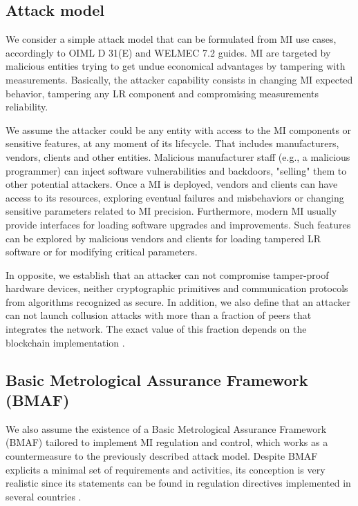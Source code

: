 \documentclass[conference]{IEEEtran}
\begin{document}
\subsection{Attack model}
We consider a simple attack model that can be formulated from MI use cases, accordingly to OIML D 31(E) and WELMEC 7.2 guides. MI are targeted by malicious entities trying to get undue economical advantages by tampering with measurements. Basically, the attacker capability consists in changing MI expected behavior, tampering any LR component and compromising measurements reliability. 

We assume the attacker could be any entity with access to the MI components or sensitive features, at any moment of its lifecycle. That includes manufacturers, vendors, clients and other entities. Malicious manufacturer staff (e.g., a malicious programmer) can inject software vulnerabilities and backdoors, "selling" them to other potential attackers. Once a MI is deployed, vendors and clients can have access to its resources, exploring eventual failures and misbehaviors or changing sensitive parameters related to MI precision. Furthermore, modern MI usually provide interfaces for loading software upgrades and improvements. Such features can be explored by malicious vendors and clients for loading tampered LR software or for modifying critical parameters.

In opposite, we establish that an attacker can not compromise tamper-proof hardware devices, neither cryptographic primitives and communication protocols from algorithms recognized as secure. In addition, we also define that an attacker can not launch collusion attacks with more than a fraction of peers that integrates the network. The exact value of this fraction depends on the blockchain implementation \cite{Vukolic2016}. %

\subsection{Basic Metrological Assurance Framework (BMAF)}
We also assume the existence of a Basic Metrological Assurance Framework (BMAF) tailored to implement MI regulation and control, which works as a countermeasure to the  previously described attack model. Despite BMAF explicits a minimal set of requirements and activities, its conception is very realistic since its statements can be found in regulation directives implemented in several countries \cite{Esche2015,Camara2012,Boccardo2014,Luchsinger2008}.
\end{document}
